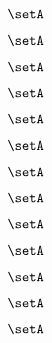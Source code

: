 \begin{forslides}
    \begin{equation}
        \label{eq:feedback-163}
        \setA
    \end{equation}

    \begin{equation}
        \label{eq:feedback-164}
        \setA
    \end{equation}

    \begin{equation}
        \label{eq:feedback-165}
        \setA
    \end{equation}

    \begin{equation}
        \label{eq:feedback-166}
        \setA
    \end{equation}

    \begin{equation}
        \label{eq:feedback-167}
        \setA
    \end{equation}

    \begin{equation}
        \label{eq:feedback-168}
        \setA
    \end{equation}

    \begin{equation}
        \label{eq:feedback-169}
        \setA
    \end{equation}

    \begin{equation}
        \label{eq:feedback-170}
        \setA
    \end{equation}

    \begin{equation}
        \label{eq:feedback-171}
        \setA
    \end{equation}

    \begin{equation}
        \label{eq:feedback-172}
        \setA
    \end{equation}

    \begin{equation}
        \label{eq:feedback-173}
        \setA
    \end{equation}

    \begin{equation}
        \label{eq:feedback-174}
        \setA
    \end{equation}

    \begin{equation}
        \label{eq:feedback-175}
        \setA
    \end{equation}


\end{forslides}
